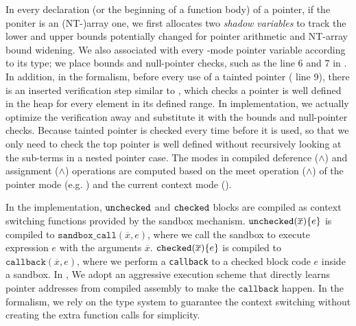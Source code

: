 %
In every declaration (or the beginning of a function body) of a pointer,
if the poniter is an (NT-)array one,
we first allocates two \emph{shadow variables}
to track the lower and upper bounds potentially changed for pointer arithmetic and NT-array bound widening.
We also associated with every \cmode-mode pointer variable according to its type;
we place bounds and null-pointer checks, such as the line 6 and 7 in .
In addition, in the formalism, before every use of a tainted pointer ( line 9), 
there is an inserted verification step similar to ,
which checks a pointer is well defined in the heap for every element in its defined range.
In implementation, we actually optimize the verification away and substitute it
with the bounds and null-pointer checks.
Because tainted pointer is checked every time before it is used,
so that we only need to check the top pointer is 
well defined without recursively looking at the sub-terms in a nested pointer case.
The modes in compiled deference ($\wedge$)
 and assignment ($\wedge$) operations 
are computed based on the meet 
operation ($\wedge$) of the pointer mode (e.g. ) and the current context mode ().

%
In the implementation,
$\mathtt{unchecked}$ and $\mathtt{checked}$ blocks 
are compiled as context switching functions provided by the sandbox mechanism.
$\mathtt{unchecked}({\overline{x}})\{e\}$ is compiled to 
$\texttt{sandbox\_call}(\overline{x},e)$, where we call the sandbox 
to execute expression $e$ with the arguments $\overline{x}$.
$\mathtt{checked}({\overline{x}}){\{e\}}$ is compiled to 
$\texttt{callback}(\overline{x},e)$, where we perform 
a \texttt{callback} to a checked block code $e$ inside a sandbox.
In \systemname, We adopt an aggressive execution scheme that
directly learns pointer addresses from compiled assembly to make the $\texttt{callback}$ happen.
In the formalism, we rely on the type system to 
guarantee the context switching without creating the extra function calls for simplicity.


